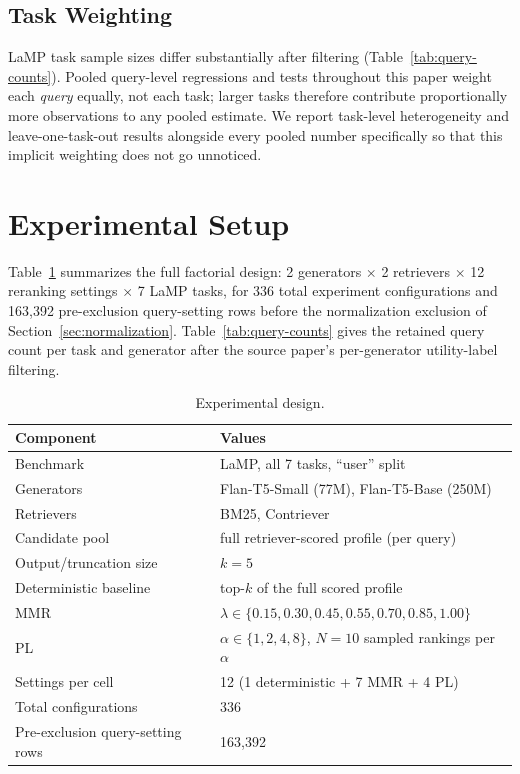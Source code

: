 \documentclass[11pt]{article}
\begin{document}
\subsection{Task Weighting}

LaMP task sample sizes differ substantially after filtering
(Table~\ref{tab:query-counts}). Pooled query-level regressions and tests
throughout this paper weight each \emph{query} equally, not each task;
larger tasks therefore contribute proportionally more observations to any
pooled estimate. We report task-level heterogeneity and leave-one-task-out
results alongside every pooled number specifically so that this implicit
weighting does not go unnoticed.

\section{Experimental Setup}
\label{sec:setup}

Table~\ref{tab:setup} summarizes the full factorial design: 2 generators
$\times$ 2 retrievers $\times$ 12 reranking settings $\times$ 7 LaMP
tasks, for 336 total experiment configurations and 163{,}392 pre-exclusion
query-setting rows before the normalization exclusion of
Section~\ref{sec:normalization}. Table~\ref{tab:query-counts} gives the
retained query count per task and generator after the source paper's
per-generator utility-label filtering.

\begin{table}[htbp]
\centering
\caption{Experimental design.}
\label{tab:setup}
\begin{tabular}{ll}
\toprule
Component & Values \\
\midrule
Benchmark & LaMP, all 7 tasks, ``user'' split \\
Generators & Flan-T5-Small (77M), Flan-T5-Base (250M) \\
Retrievers & BM25, Contriever \\
Candidate pool & full retriever-scored profile (per query) \\
Output/truncation size & $k=5$ \\
Deterministic baseline & top-$k$ of the full scored profile \\
MMR & $\lambda \in \{0.15, 0.30, 0.45, 0.55, 0.70, 0.85, 1.00\}$ \\
PL & $\alpha \in \{1, 2, 4, 8\}$, $N=10$ sampled rankings per $\alpha$ \\
Settings per cell & 12 (1 deterministic + 7 MMR + 4 PL) \\
Total configurations & 336 \\
Pre-exclusion query-setting rows & 163{,}392 \\
\bottomrule
\end{tabular}
\end{table}
\end{document}
